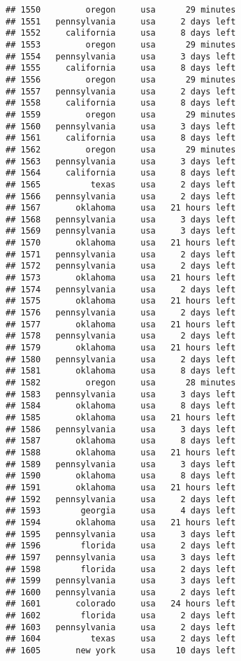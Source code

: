 \documentclass[
]{article}
\begin{document}
\begin{verbatim}
## 1550         oregon     usa      29 minutes
## 1551   pennsylvania     usa     2 days left
## 1552     california     usa     8 days left
## 1553         oregon     usa      29 minutes
## 1554   pennsylvania     usa     3 days left
## 1555     california     usa     8 days left
## 1556         oregon     usa      29 minutes
## 1557   pennsylvania     usa     2 days left
## 1558     california     usa     8 days left
## 1559         oregon     usa      29 minutes
## 1560   pennsylvania     usa     3 days left
## 1561     california     usa     8 days left
## 1562         oregon     usa      29 minutes
## 1563   pennsylvania     usa     3 days left
## 1564     california     usa     8 days left
## 1565          texas     usa     2 days left
## 1566   pennsylvania     usa     2 days left
## 1567       oklahoma     usa   21 hours left
## 1568   pennsylvania     usa     3 days left
## 1569   pennsylvania     usa     3 days left
## 1570       oklahoma     usa   21 hours left
## 1571   pennsylvania     usa     2 days left
## 1572   pennsylvania     usa     2 days left
## 1573       oklahoma     usa   21 hours left
## 1574   pennsylvania     usa     2 days left
## 1575       oklahoma     usa   21 hours left
## 1576   pennsylvania     usa     2 days left
## 1577       oklahoma     usa   21 hours left
## 1578   pennsylvania     usa     2 days left
## 1579       oklahoma     usa   21 hours left
## 1580   pennsylvania     usa     2 days left
## 1581       oklahoma     usa     8 days left
## 1582         oregon     usa      28 minutes
## 1583   pennsylvania     usa     3 days left
## 1584       oklahoma     usa     8 days left
## 1585       oklahoma     usa   21 hours left
## 1586   pennsylvania     usa     3 days left
## 1587       oklahoma     usa     8 days left
## 1588       oklahoma     usa   21 hours left
## 1589   pennsylvania     usa     3 days left
## 1590       oklahoma     usa     8 days left
## 1591       oklahoma     usa   21 hours left
## 1592   pennsylvania     usa     2 days left
## 1593        georgia     usa     4 days left
## 1594       oklahoma     usa   21 hours left
## 1595   pennsylvania     usa     3 days left
## 1596        florida     usa     2 days left
## 1597   pennsylvania     usa     3 days left
## 1598        florida     usa     2 days left
## 1599   pennsylvania     usa     3 days left
## 1600   pennsylvania     usa     2 days left
## 1601       colorado     usa   24 hours left
## 1602        florida     usa     2 days left
## 1603   pennsylvania     usa     2 days left
## 1604          texas     usa     2 days left
## 1605       new york     usa    10 days left

\end{verbatim}
\end{document}
